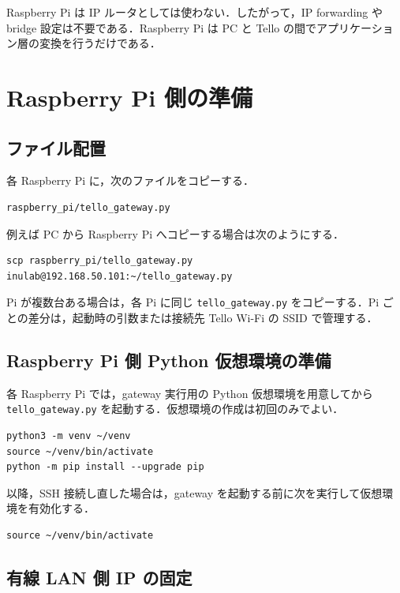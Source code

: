 Raspberry Pi は IP ルータとしては使わない．したがって，IP forwarding や bridge 設定は不要である．Raspberry Pi は PC と Tello の間でアプリケーション層の変換を行うだけである．

\section{Raspberry Pi 側の準備}
\label{sec:pi_setup}

\subsection{ファイル配置}

各 Raspberry Pi に，次のファイルをコピーする．

\begin{lstlisting}
raspberry_pi/tello_gateway.py
\end{lstlisting}

例えば PC から Raspberry Pi へコピーする場合は次のようにする．

\begin{lstlisting}
scp raspberry_pi/tello_gateway.py inulab@192.168.50.101:~/tello_gateway.py
\end{lstlisting}

Pi が複数台ある場合は，各 Pi に同じ \texttt{tello\_gateway.py} をコピーする．Pi ごとの差分は，起動時の引数または接続先 Tello Wi-Fi の SSID で管理する．

\subsection{Raspberry Pi 側 Python 仮想環境の準備}

各 Raspberry Pi では，gateway 実行用の Python 仮想環境を用意してから \texttt{tello\_gateway.py} を起動する．仮想環境の作成は初回のみでよい．

\begin{lstlisting}
python3 -m venv ~/venv
source ~/venv/bin/activate
python -m pip install --upgrade pip
\end{lstlisting}

以降，SSH 接続し直した場合は，gateway を起動する前に次を実行して仮想環境を有効化する．

\begin{lstlisting}
source ~/venv/bin/activate
\end{lstlisting}

\subsection{有線 LAN 側 IP の固定}

